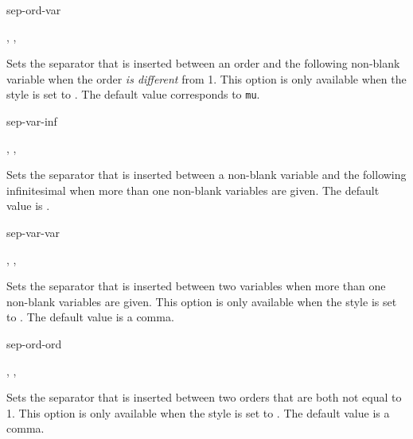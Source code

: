 \begin{option}{sep-ord-var}
	\begin{values}[default = 0]
		, , 
	\end{values}
	Sets the separator that is inserted between an order and the following non-blank variable when the order \emph{is different} from \num{1}. This option is only available when the style is set to . The default value corresponds to  \texttt{mu}.
	\begin{example}
	\end{example}
\end{option}

\begin{option}{sep-var-inf}
	\begin{values}[default = \cs{mathop}\{\}\cs{!}]
		, , \marg{delimiter}
	\end{values}
	Sets the separator that is inserted between a non-blank variable and the following infinitesimal when more than one non-blank variables are given. The default value is \val{\default}.
	\begin{example}
		\odif[sep-var-inf=\here]{x,y}
	\end{example}
\end{option}

\begin{option}{sep-var-var}
	\begin{values}[default = {{,}}]
		, , 
	\end{values}
	Sets the separator that is inserted between two variables when more than one non-blank variables are given. This option is only available when the style is set to . The default value is a comma.
	\begin{example}
		\odif*[sep-var-var=\here]{x,y}
	\end{example}
\end{option}

\begin{option}{sep-ord-ord}
	\begin{values}[default = {{,}}]
		, , 
	\end{values}
	Sets the separator that is inserted between two orders that are both not equal to \num{1}. This option is only available when the style is set to . The default value is a comma.
	\begin{example}
		\odif*[sep-ord-ord=\here, order={2,n}]{x,y}
	\end{example}
\end{option}

